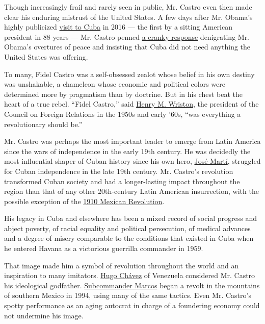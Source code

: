 Though increasingly frail and rarely seen in public, Mr. Castro even
then made clear his enduring mistrust of the United States. A few days
after Mr. Obama's highly publicized
\href{http://www.nytimes3xbfgragh.onion/2016/03/21/world/americas/obama-arrives-in-cuba.html}{visit
to Cuba} in 2016 --- the first by a sitting American president in 88
years --- Mr. Castro penned
\href{http://www.nytimes3xbfgragh.onion/2016/03/29/world/americas/fidel-castro-criticizes-barack-obamas-efforts-to-change-cuba.html}{a
cranky response} denigrating Mr. Obama's overtures of peace and
insisting that Cuba did not need anything the United States was
offering.

To many, Fidel Castro was a self-obsessed zealot whose belief in his own
destiny was unshakable, a chameleon whose economic and political colors
were determined more by pragmatism than by doctrine. But in his chest
beat the heart of a true rebel. ``Fidel Castro,'' said
\href{http://www.nytimes3xbfgragh.onion/1978/03/09/archives/henry-wriston-dies-brown-head-193755-educator-88-helped-to-draw-up.html}{Henry
M. Wriston}, the president of the Council on Foreign Relations in the
1950s and early '60s, ``was everything a revolutionary should be.''

Mr. Castro was perhaps the most important leader to emerge from Latin
America since the wars of independence in the early 19th century. He was
decidedly the most influential shaper of Cuban history since his own
hero,
\href{http://academic.eb.com/EBchecked/topic/366828/Jose-Julian-Marti}{José
Martí}, struggled for Cuban independence in the late 19th century. Mr.
Castro's revolution transformed Cuban society and had a longer-lasting
impact throughout the region than that of any other 20th-century Latin
American insurrection, with the possible exception of the
\href{http://www.nytimes3xbfgragh.onion/1988/03/13/books/history-out-of-chaos.html?pagewanted=all}{1910
Mexican Revolution}.

His legacy in Cuba and elsewhere has been a mixed record of social
progress and abject poverty, of racial equality and political
persecution, of medical advances and a degree of misery comparable to
the conditions that existed in Cuba when he entered Havana as a
victorious guerrilla commander in 1959.

That image made him a symbol of revolution throughout the world and an
inspiration to many imitators.
\href{http://www.nytimes3xbfgragh.onion/2013/03/06/world/americas/hugo-chavez-venezuelas-polarizing-leader-dies-at-58.html}{Hugo
Chávez} of Venezuela considered Mr. Castro his ideological godfather.
\href{http://www.nytimes3xbfgragh.onion/1994/02/21/world/how-a-revolution-survived-a-mexican-chronicle.html}{Subcommander
Marcos} began a revolt in the mountains of southern Mexico in 1994,
using many of the same tactics. Even Mr. Castro's spotty performance as
an aging autocrat in charge of a foundering economy could not undermine
his image.

